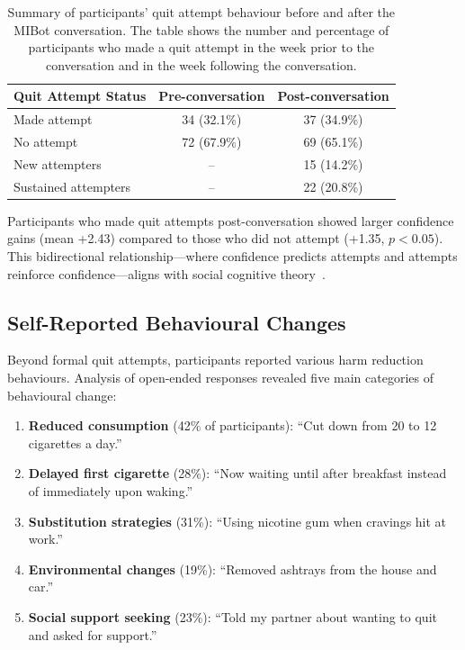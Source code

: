 \begin{table}[ht]
	\centering
	\small
	\setlength{\tabcolsep}{4pt}
	\renewcommand{\arraystretch}{1.1}
	\begin{tabular}{@{}lcc@{}}
		\toprule
		\textbf{Quit Attempt Status} & \textbf{Pre-conversation} & \textbf{Post-conversation} \\
		\midrule
		Made attempt                 & 34 (32.1\%)               & 37 (34.9\%)                \\
		No attempt                   & 72 (67.9\%)               & 69 (65.1\%)                \\
		\midrule
		New attempters               & --                        & 15 (14.2\%)                \\
		Sustained attempters         & --                        & 22 (20.8\%)                \\
		\bottomrule
	\end{tabular}
	\caption[Quit Attempt Behaviour Before and After MIBot]{Summary of participants' quit attempt behaviour before and after the MIBot conversation. The table shows the number and percentage of participants who made a quit attempt in the week prior to the conversation and in the week following the conversation.}
	\label{table:quit_attempts}
\end{table}

Participants who made quit attempts post-conversation showed larger confidence gains (mean +2.43) compared to those who did not attempt (+1.35, $p<0.05$). This bidirectional relationship---where confidence predicts attempts and attempts reinforce confidence---aligns with social cognitive theory~\citep{Bandura1986}.

\subsection*{Self-Reported Behavioural Changes}

Beyond formal quit attempts, participants reported various harm reduction behaviours. Analysis of open-ended responses revealed five main categories of behavioural change:

\begin{enumerate}
	\item \textbf{Reduced consumption} (42\% of participants): ``Cut down from 20 to 12 cigarettes a day.''
	\item \textbf{Delayed first cigarette} (28\%): ``Now waiting until after breakfast instead of immediately upon waking.''
	\item \textbf{Substitution strategies} (31\%): ``Using nicotine gum when cravings hit at work.''
	\item \textbf{Environmental changes} (19\%): ``Removed ashtrays from the house and car.''
	\item \textbf{Social support seeking} (23\%): ``Told my partner about wanting to quit and asked for support.''
\end{enumerate}

